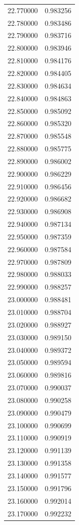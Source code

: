 \begin{tabular}{rr}
22.770000 & 0.983256 \\
22.780000 & 0.983486 \\
22.790000 & 0.983716 \\
22.800000 & 0.983946 \\
22.810000 & 0.984176 \\
22.820000 & 0.984405 \\
22.830000 & 0.984634 \\
22.840000 & 0.984863 \\
22.850000 & 0.985092 \\
22.860000 & 0.985320 \\
22.870000 & 0.985548 \\
22.880000 & 0.985775 \\
22.890000 & 0.986002 \\
22.900000 & 0.986229 \\
22.910000 & 0.986456 \\
22.920000 & 0.986682 \\
22.930000 & 0.986908 \\
22.940000 & 0.987134 \\
22.950000 & 0.987359 \\
22.960000 & 0.987584 \\
22.970000 & 0.987809 \\
22.980000 & 0.988033 \\
22.990000 & 0.988257 \\
23.000000 & 0.988481 \\
23.010000 & 0.988704 \\
23.020000 & 0.988927 \\
23.030000 & 0.989150 \\
23.040000 & 0.989372 \\
23.050000 & 0.989594 \\
23.060000 & 0.989816 \\
23.070000 & 0.990037 \\
23.080000 & 0.990258 \\
23.090000 & 0.990479 \\
23.100000 & 0.990699 \\
23.110000 & 0.990919 \\
23.120000 & 0.991139 \\
23.130000 & 0.991358 \\
23.140000 & 0.991577 \\
23.150000 & 0.991796 \\
23.160000 & 0.992014 \\
23.170000 & 0.992232 \\

\end{tabular}

